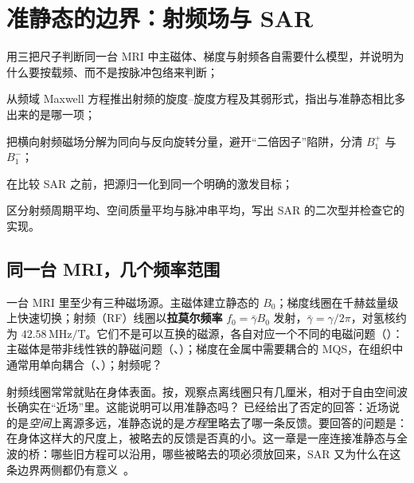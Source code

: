 \chapter{准静态的边界：射频场与 SAR}\label{ch:rf}

\begin{chapterguide}
\begin{guidegoals}
\item 用三把尺子判断同一台 MRI 中主磁体、梯度与射频各自需要什么模型，并说明为什么要按载频、而不是按脉冲包络来判断；
\item 从频域 Maxwell 方程推出射频的旋度--旋度方程及其弱形式，指出与准静态相比多出来的是哪一项；
\item 把横向射频磁场分解为同向与反向旋转分量，避开“二倍因子”陷阱，分清 $B_1^+$ 与 $B_1^-$；
\item 在比较 SAR 之前，把源归一化到同一个明确的激发目标；
\item 区分射频周期平均、空间质量平均与脉冲串平均，写出 SAR 的二次型并检查它的实现。
\end{guidegoals}
\end{chapterguide}

\section{同一台 MRI，几个频率范围}\label{sec:rf-ranges}

一台 MRI 里至少有三种磁场源。主磁体建立静态的 $B_0$；梯度线圈在千赫兹量级上快速切换；射频（RF）线圈以\textbf{拉莫尔频率} $f_0=\bar\gamma B_0$ 发射，$\bar\gamma=\gamma/2\pi$，对氢核约为 $42.58\,\mathrm{MHz/T}$。它们不是可以互换的磁源，各自对应一个不同的电磁问题（）：主磁体是带非线性铁的静磁问题（、）；梯度在金属中需要耦合的 MQS，在组织中通常用单向耦合（、）；射频呢？

射频线圈常常就贴在身体表面。按，观察点离线圈只有几厘米，相对于自由空间波长确实在“近场”里。这能说明可以用准静态吗？ 已经给出了否定的回答：近场说的是\emph{空间}上离源多远，准静态说的是\emph{方程}里略去了哪一条反馈。要回答的问题是：在身体这样大的尺度上，被略去的反馈是否真的小。这一章是一座连接准静态与全波的桥：哪些旧方程可以沿用，哪些被略去的项必须放回来，SAR 又为什么在这条边界两侧都仍有意义~\cite{rf,qslimits}。


